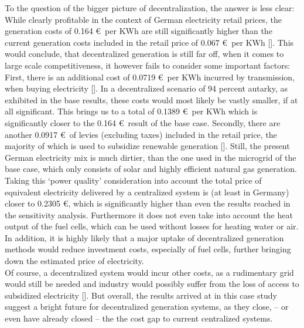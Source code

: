 \documentclass[
	11pt,								%
	DIV10,								%
	a4paper,         					%
	oneside,							%
	headheight=20pt,					%
	footheight=20pt,					%
    parskip=full,						%
    listof=totoc,						%
	bibliography=totoc,					%
	index=totoc,						%
]{scrartcl}
\begin{document}
To the question of the bigger picture of decentralization, the answer is less clear: While clearly profitable in the context of German electricity retail prices, the generation costs of 0.164 \euro\ per KWh are still significantly higher than the current generation costs included in the retail price of 0.067 \euro\ per KWh [\cite{Monitoringbericht20182018}]. This would conclude, that decentralized generation is still far off, when it comes to large scale competitiveness, it however fails to consider some important factors: First, there is an additional cost of 0.0719 \euro\ per KWh incurred by transmission, when buying electricity [\cite{Monitoringbericht20182018}]. 
In a decentralized scenario of 94 percent autarky, as exhibited in the base results, these costs would most likely be vastly smaller, if at all significant. This brings us to a total of 0.1389 \euro\ per KWh which is significantly closer to the 0.164 \euro\ result of the base case. Secondly, there are another 0.0917 \euro\ of levies (excluding taxes) included in the retail price, the majority of which is used to subsidize renewable generation [\cite{Monitoringbericht20182018}]. Still, the present German electricity mix is much dirtier, than the one used in the microgrid of the base case, which only consists of solar and highly efficient natural gas generation. 
Taking this `power quality' consideration into account the total price of equivalent electricity delivered by a centralized system is (at least in Germany) closer to 0.2305 \euro, which is significantly higher than even the results reached in the sensitivity analysis. Furthermore it does not even take into account the heat output of the fuel cells, which can be used without losses for heating water or air.\\
	In addition, it is highly likely that a major uptake of decentralized generation methods would reduce investment costs, especially of fuel cells, further bringing down the estimated price of electricity. \\
	Of course, a decentralized system would incur other costs, as a rudimentary grid would still be needed and industry would possibly suffer from the loss of access to subsidized electricity [\cite{kuechlerIndustriestrompreiseDeutschlandUnd2014}].
	But overall, the results arrived at in this case study suggest a bright future for decentralized generation systems, as they close, – or even have already closed – the the cost gap to current centralized systems.
	
\newpage
{}	
\end{document}

